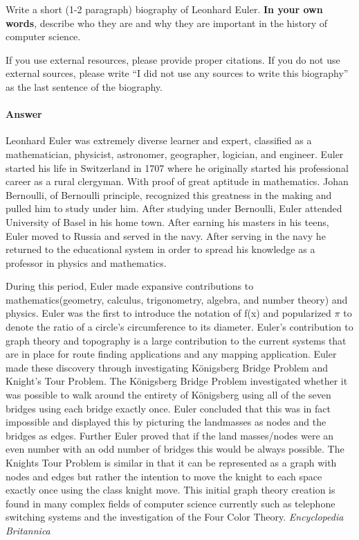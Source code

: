 \documentclass{article}
\begin{document}

Write a short (1-2 paragraph) biography of Leonhard Euler.
\textbf{In your own words}, describe who they are and why they are important in
the history of computer science.

If you use external resources, please provide
proper citations. If you do not use external sources, please write ``I did not
use any sources to write this biography'' as the last sentence of the
biography.

\paragraph{Answer}

Leonhard Euler was extremely diverse learner and expert, classified as a
mathematician, physicist, astronomer, geographer, logician, and engineer.
Euler started his life in Switzerland in 1707 where he originally started his
professional career as a rural clergyman. With proof of great aptitude in
mathematics. Johan Bernoulli, of Bernoulli principle, recognized this greatness
in the making and pulled him to study under him. After studying under Bernoulli,
Euler attended University of Basel in his home town. After earning his masters
in his teens, Euler moved to Russia and served in the navy. After serving in the
navy he returned to the educational system in order to spread his knowledge as a
professor in physics and mathematics.

During this period, Euler made expansive contributions to mathematics(geometry,
calculus, trigonometry, algebra, and number theory) and physics. Euler was the
first to introduce the notation of f(x) and popularized $\pi$ to denote the ratio
of a circle's circumference to its diameter. Euler's contribution to graph theory
and topography is a large contribution to the current systems that are in place
for route finding applications and any mapping application. Euler made these
discovery through investigating Königsberg Bridge Problem and Knight's Tour Problem.
The Königsberg Bridge Problem investigated whether it was possible to walk around
the entirety of Königsberg using all of the seven bridges using each bridge exactly
once. Euler concluded that this was in fact impossible and displayed this by picturing
the landmasses as nodes and the bridges as edges. Further Euler proved that if
the land masses/nodes were an even number with an odd number of bridges this
would be always possible. The Knights Tour Problem is similar
in that it can be represented as a graph with nodes and edges but rather the
intention to move the knight to each space exactly once using the class knight
move. This initial graph theory creation is found in many complex fields of computer
science currently such as telephone switching systems and the investigation of
the Four Color Theory.
\emph{Encyclopedia}~\cite{encyclopedia}
\emph{Britannica}~\cite{britannica}


 \newpage
 
 
\end{document}
